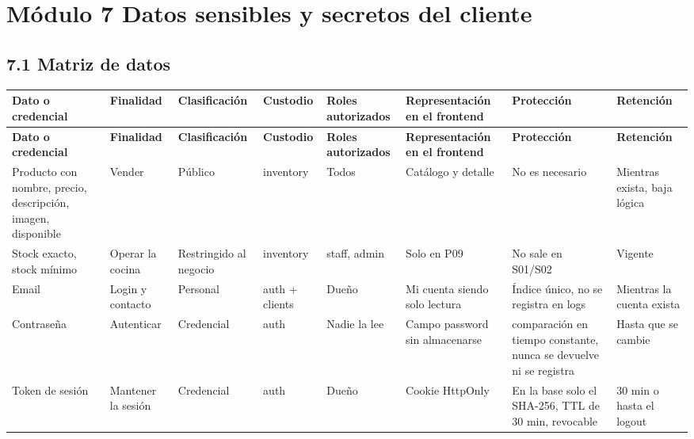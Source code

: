 \documentclass[10pt,letterpaper]{article}
\begin{document}
\section*{Módulo 7 Datos sensibles y secretos del cliente}
\begin{landscape}

\subsection*{7.1 Matriz de datos}
{\scriptsize
\begin{longtable}{|P{\tabcolsep\relax}|P{\tabcolsep\relax}|P{\tabcolsep\relax}|P{\tabcolsep\relax}|P{\tabcolsep\relax}|P{\tabcolsep\relax}|P{\tabcolsep\relax}|P{\tabcolsep\relax}|}
\hline
\textbf{Dato o credencial} & \textbf{Finalidad} & \textbf{Clasificación} & \textbf{Custodio} & \textbf{Roles autorizados} & \textbf{Representación en el frontend} & \textbf{Protección} & \textbf{Retención} \\ \hline
\endfirsthead
\hline
\textbf{Dato o credencial} & \textbf{Finalidad} & \textbf{Clasificación} & \textbf{Custodio} & \textbf{Roles autorizados} & \textbf{Representación en el frontend} & \textbf{Protección} & \textbf{Retención} \\ \hline
\endhead
Producto con nombre, precio, descripción, imagen, disponible & Vender & Público & inventory & Todos & Catálogo y detalle & No es necesario & Mientras exista, baja lógica \\ \hline
Stock exacto, stock mínimo & Operar la cocina & Restringido al negocio & inventory & staff, admin & Solo en P09 & No sale en S01/\allowbreak{}S02 & Vigente \\ \hline
Email & Login y contacto & Personal & auth + clients & Dueño & Mi cuenta siendo solo lectura & Índice único, no se registra en logs & Mientras la cuenta exista \\ \hline
Contraseña & Autenticar & Credencial & auth & Nadie la lee & Campo password sin almacenarse & comparación en tiempo constante, nunca se devuelve ni se registra & Hasta que se cambie \\ \hline
Token de sesión & Mantener la sesión & Credencial & auth & Dueño & Cookie HttpOnly & En la base solo el SHA-256, TTL de 30 min, revocable & 30 min o hasta el logout \\ \hline

\end{longtable}}
\end{landscape}
\end{document}
